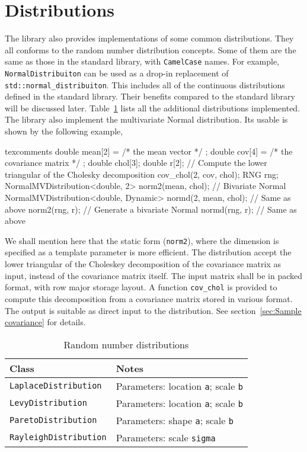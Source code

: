 \section{Distributions}
\label{sec:Distributions}

The library also provides implementations of some common distributions. They
all conforms to the \cppoo random number distribution concepts. Some of them
are the same as those in the \cppoo standard library, with \verb|CamelCase|
names. For example, \verb|NormalDistribuiton| can be used as a drop-in
replacement of \verb|std::normal_distribuiton|. This includes all of the
continuous distributions defined in the standard library. Their benefits
compared to the standard library will be discussed later.
Table~\ref{tab:Random number distributions} lists all the additional
distributions implemented. The library also implement the multivariate Normal
distribution. Its usable is shown by the following example,
\begin{cppcode*}{texcomments}
  double mean[2] = { /* the mean vector */ };
  double cov[4] = { /* the covariance matrix */ };
  double chol[3];
  double r[2];
  // Compute the lower triangular of the Cholesky decomposition
  cov_chol(2, cov, chol);
  RNG rng;
  NormalMVDistribution<double, 2> norm2(mean, chol); // Bivariate Normal
  NormalMVDistribution<double, Dynamic> normd(2, mean, chol); // Same as above
  norm2(rng, r); // Generate a bivariate Normal
  normd(rng, r); // Same as above
\end{cppcode*}
We shall mention here that the static form (\verb|norm2|), where the dimension
is specified as a template parameter is more efficient. The distribution accept
the lower triangular of the Choleskey decomposition of the covariance matrix as
input, instead of the covariance matrix itself. The input matrix shall be in
packed format, with row major storage layout. A function \verb|cov_chol| is
provided to compute this decomposition from a covariance matrix stored in
various format. The output is suitable as direct input to the distribution. See
section~\ref{sec:Sample covariance} for details.

\begin{table}
  \begin{tabularx}{\textwidth}{lX}
    \toprule
    Class & Notes \\
    \midrule
    \verb|LaplaceDistribution|
    & Parameters: location \texttt{a}; scale \texttt{b} \\
    \verb|LevyDistribution|
    & Parameters: location \texttt{a}; scale \texttt{b} \\
    \verb|ParetoDistribution|
    & Parameters: shape \texttt{a}; scale \texttt{b} \\
    \verb|RayleighDistribution|
    & Parameters: scale \texttt{sigma} \\
    \bottomrule
  \end{tabularx}
  \caption{Random number distributions}
  \label{tab:Random number distributions}
\end{table}


